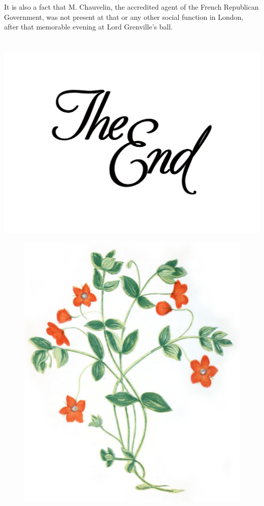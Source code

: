 \documentclass[paper=5.5in:8.5in,BCOR=7mm,twoside,DIV=calc,12pt,usegeometry,chapterprefix,endperiod,headings=big]{scrbook}
\begin{document}
It is also a fact that M. Chauvelin, the accredited agent of the French Republican Government, was not present at that or any other social function in London, after that memorable evening at Lord Grenville's ball.
~\\
~\\
~\\
\centering
\includegraphics[width=0.7\linewidth]{theend}
\clearpage
\vfill
\begin{figure}[p!]
\centering
\includegraphics[width=\linewidth]{scarletflowers}
\label{flowers}
\end{figure}
\vfill
\thispagestyle{empty}
\clearpage
\end{document}
